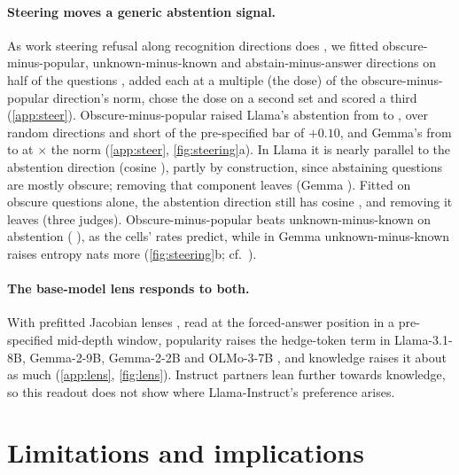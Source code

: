 \documentclass{article}
\begin{document}
\paragraph{Steering moves a generic abstention signal.} As work steering refusal along recognition directions does \citep{ferrando2025iknow,brzezinka2026familiarity}, we fitted obscure-minus-popular, unknown-minus-known and abstain-minus-answer directions on half of the questions \citep{arditi2024refusal,rimsky2024caa}, added each at a multiple (the dose) of the obscure-minus-popular direction's norm, chose the dose on a second set and scored a third (\cref{app:steer}). Obscure-minus-popular raised Llama's abstention from \svLlamaNone{} to \svLlamaFam, \svLlamaDOne{} \svLlamaDOneCI{} over random directions and short of the pre-specified bar of $+0.10$, and Gemma's from \svGemmaNone{} to \svGemmaFam{} at \svGemmaDose$\times$ the norm (\cref{app:steer}, \cref{fig:steering}a). In Llama it is nearly parallel to the abstention direction (cosine \svLlamaCos), partly by construction, since abstaining questions are mostly obscure; removing that component leaves \svLlamaDTwo{} \svLlamaDTwoCI{} (Gemma \svGemmaDTwo{} \svGemmaDTwoCI). Fitted on obscure questions alone, the abstention direction still has cosine \wlLlamaCos, and removing it leaves \wlLlamaDTwo{} \wlLlamaDTwoCI{} (three judges). Obscure-minus-popular beats unknown-minus-known on abstention (\svLlamaDThree{} \svLlamaDThreeCI), as the cells' rates predict, while in Gemma unknown-minus-known raises entropy \svGemmaDFour{} \svGemmaDFourCI{} nats more (\cref{fig:steering}b; cf.\ \citealp{che2026steering}).

\paragraph{The base-model lens responds to both.} With prefitted Jacobian lenses \citep{gurnee2026workspace}, read at the forced-answer position in a pre-specified mid-depth window, popularity raises the hedge-token term in Llama-3.1-8B, Gemma-2-9B, Gemma-2-2B and OLMo-3-7B \citep{olmo3}, and knowledge raises it about as much (\cref{app:lens}, \cref{fig:lens}). Instruct partners lean further towards knowledge, so this readout does not show where Llama-Instruct's preference arises.

\section{Limitations and implications}
\end{document}
